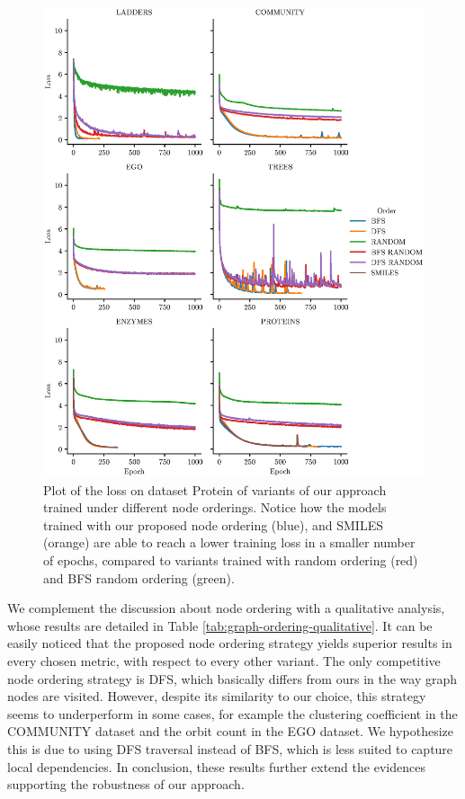 \begin{figure}[h!]
\centering
\includegraphics[width=\textwidth]{Figures/Chapter6/loss.eps}
\caption{Plot of the loss on dataset Protein of variants of our approach trained under different node orderings. Notice how the models trained with our proposed node ordering (blue), and SMILES (orange) are able to reach a lower training loss in a smaller number of epochs, compared to variants trained with random ordering (red) and BFS random ordering (green).}
\label{fig:loss}
\end{figure}
We complement the discussion about node ordering with a qualitative analysis, whose results are detailed in Table \ref{tab:graph-ordering-qualitative}. It can be easily noticed that the proposed node ordering strategy yields superior results in every chosen metric, with respect to every other variant. The only competitive node ordering strategy is DFS, which basically differs from ours in the way graph nodes are visited. However, despite its similarity to our choice, this strategy seems to underperform in some cases, for example the clustering coefficient in the COMMUNITY dataset and the orbit count in the EGO dataset. We hypothesize this is due to using DFS traversal instead of BFS, which is less suited to capture local dependencies. In conclusion, these results further extend the evidences supporting the robustness of our approach.
\begin{landscape}

\end{landscape}